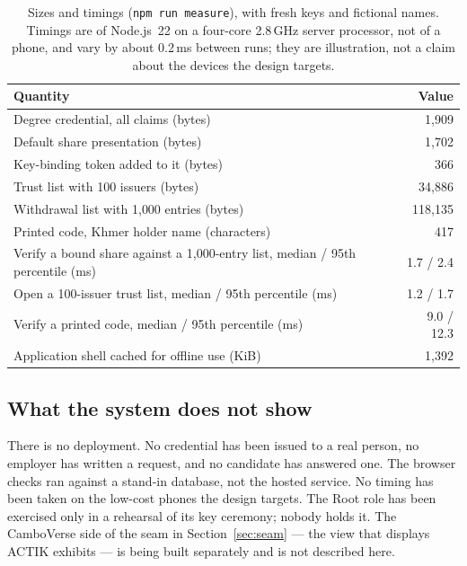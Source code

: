 \documentclass[10pt,a4paper,twocolumn]{article}
\newcommand{\code}[1]{\texttt{\small #1}}
\newenvironment{widetable}{\begin{table}[t]}{\end{table}}
\newenvironment{widetable}{\begin{table}[t]}{\end{table}}
\begin{document}
\begin{widetable}
\centering\small
\caption{Sizes and timings (\code{npm run measure}), with fresh keys and fictional
names. Timings are of Node.js~22 on a four-core 2.8\,GHz server processor, not of
a phone, and vary by about 0.2\,ms between runs; they are illustration, not a
claim about the devices the design targets.}
\label{tab:measure}
\begin{tabularx}{\linewidth}{@{}Xr@{}}
\toprule
Quantity & Value \\
\midrule
Degree credential, all claims (bytes) & 1{,}909 \\
Default share presentation (bytes) & 1{,}702 \\
Key-binding token added to it (bytes) & 366 \\
Trust list with 100 issuers (bytes) & 34{,}886 \\
Withdrawal list with 1{,}000 entries (bytes) & 118{,}135 \\
Printed code, Khmer holder name (characters) & 417 \\
Verify a bound share against a 1{,}000-entry list, median / 95th percentile (ms) & 1.7 / 2.4 \\
Open a 100-issuer trust list, median / 95th percentile (ms) & 1.2 / 1.7 \\
Verify a printed code, median / 95th percentile (ms) & 9.0 / 12.3 \\
Application shell cached for offline use (KiB) & 1{,}392 \\
\bottomrule
\end{tabularx}
\end{widetable}

\subsection{What the system does not show}

There is no deployment. No credential has been issued to a real person, no
employer has written a request, and no candidate has answered one. The browser
checks ran against a stand-in database, not the hosted service. No timing has
been taken on the low-cost phones the design targets. The Root role has been
exercised only in a rehearsal of its key ceremony; nobody holds it. The CamboVerse
side of the seam in Section~\ref{sec:seam} --- the view that displays ACTIK
exhibits --- is being built separately and is not described here.

\end{document}
